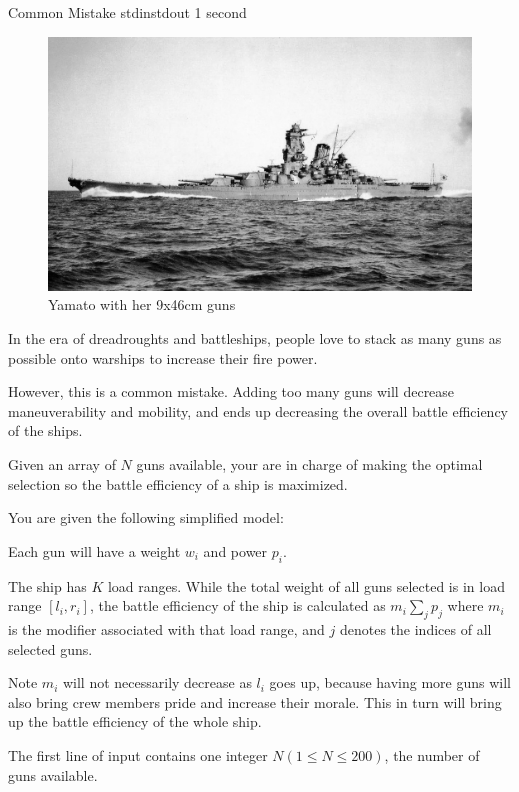 \begin{problem}{Common Mistake}
{stdin}{stdout}
{1 second}{}{}

\begin{figure}
    \includegraphics[scale=0.3]{yamato.jpg}
    \caption*{Yamato with her 9x46cm guns}
\end{figure}

In the era of dreadroughts and battleships, people love to stack as many guns as
possible onto warships to increase their fire power.

However, this is a common mistake. Adding too many guns will decrease
maneuverability and mobility, and ends up decreasing the overall battle
efficiency of the ships. 

Given an array of $N$ guns available, your are in charge of making the optimal
selection so the battle efficiency of a ship is maximized.

You are given the following simplified model:

Each gun will have a weight $w_i$ and power $p_i$.

The ship has $K$ load ranges. While the total weight of all guns selected is in
load range $[l_i, r_i]$, the battle efficiency of the ship is calculated as
$m_i\sum_j p_j$ where $m_i$ is the modifier associated with that load range, and
$j$ denotes the indices of all selected guns.

Note $m_i$ will not necessarily decrease as $l_i$ goes up,
because having more guns will also bring crew members pride and increase their 
morale. This in turn will bring up the battle efficiency of the whole ship.

\InputFile

The first line of input contains one integer $N (1 \le N \le 200)$, the number 
of guns available.


\end{problem}
